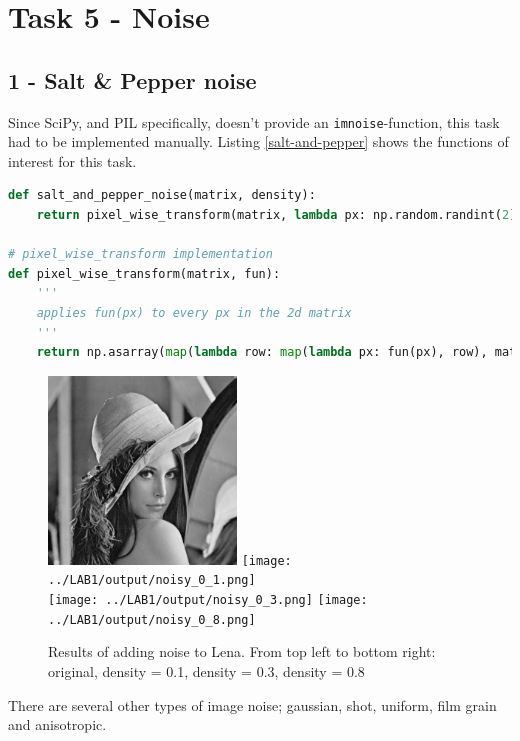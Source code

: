 \clearpage
\section*{Task 5 - Noise}

\subsection*{1 - Salt \& Pepper noise}

Since SciPy, and PIL specifically, doesn't provide an \texttt{imnoise}-function, this task had to be implemented manually. Listing \ref{salt-and-pepper} shows the functions of interest for this task.

\begin{lstlisting}[language=Python, label=salt-and-pepper, caption=Salt \& pepper noise]
def salt_and_pepper_noise(matrix, density):
    return pixel_wise_transform(matrix, lambda px: np.random.randint(2) if np.random.random() < density else px)

# pixel_wise_transform implementation
def pixel_wise_transform(matrix, fun):
    '''
    applies fun(px) to every px in the 2d matrix
    '''
    return np.asarray(map(lambda row: map(lambda px: fun(px), row), matrix))
\end{lstlisting}


\begin{figure}[h!]
    \centering
    \includegraphics[width=5cm]{../LAB1/img/lena.png}
    \texttt{[image: ../LAB1/output/noisy\_0\_1.png]} \\
    \texttt{[image: ../LAB1/output/noisy\_0\_3.png]}
    \texttt{[image: ../LAB1/output/noisy\_0\_8.png]}
    \caption{Results of adding noise to Lena. From top left to bottom right: original, density = 0.1, density = 0.3, density = 0.8}
\end{figure}

There are several other types of image noise; gaussian, shot, uniform, film grain and anisotropic.

\newpage

